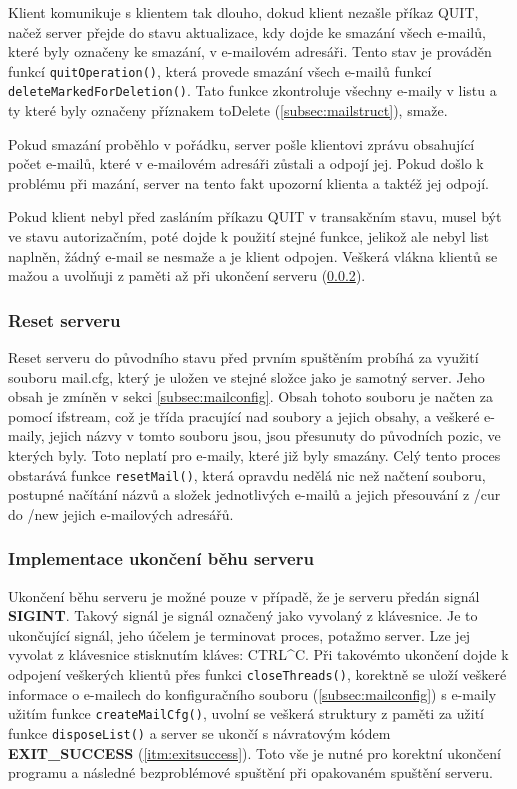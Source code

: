 \documentclass[11pt,a4paper]{report}
\begin{document}
    Klient komunikuje s klientem tak dlouho, dokud klient nezašle příkaz QUIT, načež server přejde do stavu aktualizace, kdy dojde ke smazání všech e-mailů, které byly označeny ke smazání, v e-mailovém adresáři. Tento stav je prováděn funkcí \texttt{quitOperation()}, která provede smazání všech e-mailů funkcí \texttt{deleteMarkedForDeletion()}. Tato funkce zkontroluje všechny e-maily v listu a ty které byly označeny příznakem toDelete (\ref{subsec:mailstruct}), smaže.\par
    Pokud smazání proběhlo v pořádku, server pošle klientovi zprávu obsahující počet e-mailů, které v e-mailovém adresáři zůstali a odpojí jej. Pokud došlo k problému při mazání, server na tento fakt upozorní klienta a taktéž jej odpojí.\par
    Pokud klient nebyl před zasláním příkazu QUIT v transakčním stavu, musel být ve stavu autorizačním, poté dojde k použití stejné funkce, jelikož ale nebyl list naplněn, žádný e-mail se nesmaže a je klient odpojen.
    Veškerá vlákna klientů se mažou a uvolňuji z paměti až při ukončení serveru (\ref{subsec:sigint}).
    \subsubsection{Reset serveru}
    \label{subsec:serverreset}
    Reset serveru do původního stavu před prvním spuštěním probíhá za využití souboru mail.cfg, který je uložen ve stejné složce jako je samotný server. Jeho obsah je zmíněn v sekci \ref{subsec:mailconfig}. Obsah tohoto souboru je načten za pomocí ifstream, což je třída pracující nad soubory a jejich obsahy, a veškeré e-maily, jejich názvy v tomto souboru jsou, jsou přesunuty do původních pozic, ve kterých byly. Toto neplatí pro e-maily, které již byly smazány. Celý tento proces obstarává funkce \texttt{resetMail()}, která opravdu nedělá nic než načtení souboru, postupné načítání názvů a složek jednotlivých e-mailů a jejich přesouvání z /cur do /new jejich e-mailových adresářů.
    \subsubsection{Implementace ukončení běhu serveru}
    \label{subsec:sigint}
    Ukončení běhu serveru je možné pouze v případě, že je serveru předán signál \textbf{SIGINT}. Takový signál je signál označený jako vyvolaný z klávesnice. Je to ukončující signál, jeho účelem je terminovat proces, potažmo server. Lze jej vyvolat z klávesnice stisknutím kláves: CTRL\^{}C. Při takovémto ukončení dojde k odpojení veškerých klientů přes funkci \texttt{closeThreads()}, korektně se uloží veškeré informace o e-mailech do konfiguračního souboru (\ref{subsec:mailconfig}) s e-maily užitím funkce \texttt{createMailCfg()}, uvolní se veškerá struktury z paměti za užití funkce \texttt{disposeList()} a server se ukončí s návratovým kódem \textbf{EXIT\_SUCCESS} (\ref{itm:exitsuccess}). Toto vše je nutné pro korektní ukončení programu a následné bezproblémové spuštění při opakovaném spuštění serveru.
    \clearpage
\end{document}
